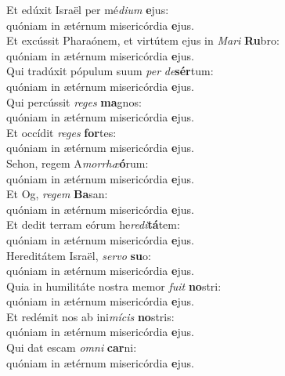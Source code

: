 \evenverse Et edúxit Israël per mé\textit{di}\textit{um} \textbf{e}jus:~\*\\
\evenverse quóniam in ætérnum misericórdia \textbf{e}jus.\\
\oddverse Et excússit Pharaónem, et virtútem ejus in \textit{Ma}\textit{ri} \textbf{Ru}bro:~\*\\
\oddverse quóniam in ætérnum misericórdia \textbf{e}jus.\\
\evenverse Qui tradúxit pópulum suum \textit{per} \textit{de}\textbf{sér}tum:~\*\\
\evenverse quóniam in ætérnum misericórdia \textbf{e}jus.\\
\oddverse Qui percússit \textit{re}\textit{ges} \textbf{ma}gnos:~\*\\
\oddverse quóniam in ætérnum misericórdia \textbf{e}jus.\\
\evenverse Et occídit \textit{re}\textit{ges} \textbf{for}tes:~\*\\
\evenverse quóniam in ætérnum misericórdia \textbf{e}jus.\\
\oddverse Sehon, regem A\textit{mor}\textit{rhæ}\textbf{ó}rum:~\*\\
\oddverse quóniam in ætérnum misericórdia \textbf{e}jus.\\
\evenverse Et Og, \textit{re}\textit{gem} \textbf{Ba}san:~\*\\
\evenverse quóniam in ætérnum misericórdia \textbf{e}jus.\\
\oddverse Et dedit terram eórum he\textit{re}\textit{di}\textbf{tá}tem:~\*\\
\oddverse quóniam in ætérnum misericórdia \textbf{e}jus.\\
\evenverse Hereditátem Israël, \textit{ser}\textit{vo} \textbf{su}o:~\*\\
\evenverse quóniam in ætérnum misericórdia \textbf{e}jus.\\
\oddverse Quia in humilitáte nostra memor \textit{fu}\textit{it} \textbf{no}stri:~\*\\
\oddverse quóniam in ætérnum misericórdia \textbf{e}jus.\\
\evenverse Et redémit nos ab ini\textit{mí}\textit{cis} \textbf{no}stris:~\*\\
\evenverse quóniam in ætérnum misericórdia \textbf{e}jus.\\
\oddverse Qui dat escam \textit{om}\textit{ni} \textbf{car}ni:~\*\\
\oddverse quóniam in ætérnum misericórdia \textbf{e}jus.\\
